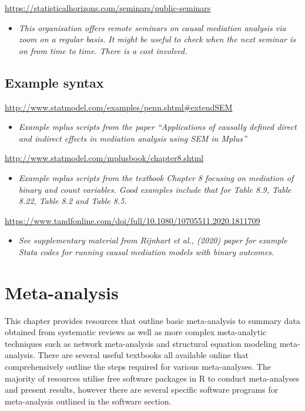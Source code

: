 \documentclass[
]{book}
\providecommand{\tightlist}{%
  \setlength{\itemsep}{0pt}\setlength{\parskip}{0pt}}
\begin{document}
\url{https://statisticalhorizons.com/seminars/public-seminars}

\begin{itemize}
\tightlist
\item
  \emph{This organisation offers remote seminars on causal mediation analysis via zoom on a regular basis. It might be useful to check when the next seminar is on from time to time. There is a cost involved.}
\end{itemize}

\section{Example syntax}\label{example-syntax-1}

\url{http://www.statmodel.com/examples/penn.shtml\#extendSEM}

\begin{itemize}
\tightlist
\item
  \emph{Example mplus scripts from the paper ``Applications of causally defined direct and indirect effects in mediation analysis using SEM in Mplus''}
\end{itemize}

\url{http://www.statmodel.com/mplusbook/chapter8.shtml}

\begin{itemize}
\tightlist
\item
  \emph{Example mplus scripts from the textbook Chapter 8 focusing on mediation of binary and count variables. Good examples include that for Table 8.9, Table 8.22, Table 8.2 and Table 8.5.}
\end{itemize}

\url{https://www.tandfonline.com/doi/full/10.1080/10705511.2020.1811709}

\begin{itemize}
\tightlist
\item
  \emph{See supplementary material from Rijnhart et al., (2020) paper for example Stata codes for running causal mediation models with binary outcomes.}
\end{itemize}

\chapter{Meta-analysis}\label{meta-analysis}

This chapter provides resources that outline basic meta-analysis to summary data obtained from systematic reviews as well as more complex meta-analytic techniques such as network meta-analysis and structural equation modeling meta-analysis. There are several useful textbooks all available online that comprehensively outline the steps required for various meta-analyses. The majority of resources utilise free software packages in R to conduct meta-analyses and present results, however there are several specific software programs for meta-analysis outlined in the software section.
\end{document}
